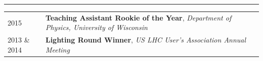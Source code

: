 \documentclass{letter}
\begin{document}
\vspace{-10pt}

\begin{flushleft}
\Large{\textsc{\textbf{\color{Maroon}{Awards}}}}
\vspace{1pt} %
\hrule
\end{flushleft}

\begin{tabular}{p{}p{}}
	2015
	&
	\textbf{Teaching Assistant Rookie of the Year}, \textit{Department of Physics, University of Wisconsin} 
\\
	2013 \& 2014
	& 
	\textbf{Lighting Round Winner}, \textit{US LHC User's Association Annual Meeting}
\\
\end{tabular}
\end{document}
